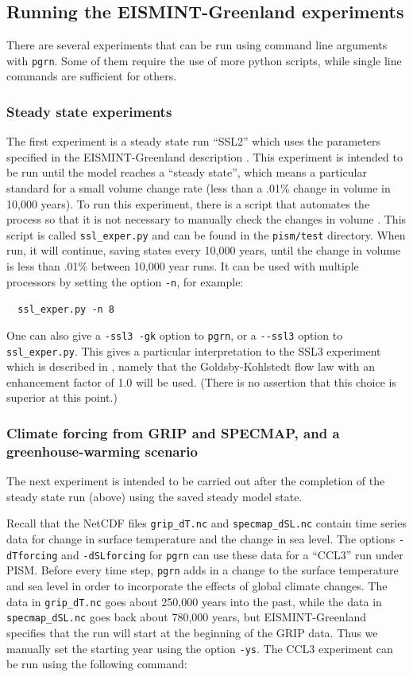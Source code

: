 \documentclass[11pt,final]{amsart}
\begin{document}
\subsection{Running the EISMINT-Greenland experiments}  There are several experiments that can be run using command line arguments with \verb|pgrn|.  Some of them require the use of more python scripts, while single line commands are sufficient for others.

\subsubsection{Steady state experiments}  The first experiment is a steady state run ``SSL2'' which uses the parameters specified in the EISMINT-Greenland description \cite{RitzEISMINT}. This experiment is intended to be run until the model reaches a ``steady state'', which means a particular standard for a small volume change rate (less than a .01\% change in volume in 10,000 years).  To run this experiment, there is a script that automates the process so that it is not necessary to manually check the changes in volume . This script is called \verb|ssl_exper.py| and can be found in the \verb|pism/test| directory.  When run, it will continue, saving states every 10,000 years, until the change in volume is less than .01\% between 10,000 year runs.  It can be used with multiple processors by setting the option \verb|-n|, for example:

\verb|  ssl_exper.py -n 8|

One can also give a \verb|-ssl3 -gk| option to \verb|pgrn|, or a \verb|--ssl3| option to \verb|ssl_exper.py|.  This gives a particular interpretation to the SSL3 experiment which is described in \cite{RitzEISMINT}, namely that the Goldsby-Kohlstedt flow law \cite{GoldsbyKohlstedt} with an enhancement factor of 1.0 will be used.  (There is no assertion that this choice is superior at this point.)

\subsubsection{Climate forcing from GRIP and SPECMAP, and a greenhouse-warming scenario}  The next experiment is intended to be carried out after the completion of the steady state run (above) using the saved steady model state. 

Recall that the NetCDF files \verb|grip_dT.nc| and \verb|specmap_dSL.nc| contain time series data for change in surface temperature and the change in sea level.  The options \verb|-dTforcing| and \verb|-dSLforcing| for \verb|pgrn| can use these data for a ``CCL3'' run \cite{RitzEISMINT} under PISM.  Before every time step, \verb|pgrn| adds in a change to the surface temperature and sea level in order to incorporate the effects of global climate changes.  The data in \verb|grip_dT.nc| goes about 250,000 years into the past, while the data in \verb|specmap_dSL.nc| goes back about 780,000 years, but EISMINT-Greenland specifies that the run will start at the beginning of the GRIP data.  Thus we manually set the starting year using the option \verb|-ys|.  The CCL3 experiment can be run using the following command:
\end{document}
